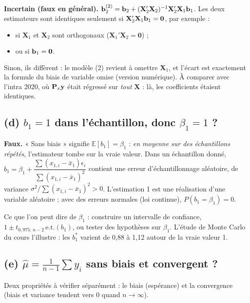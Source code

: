 \documentclass[11pt,a4paper]{article}
\newcommand{\vy}{\mathbf{y}}\newcommand{\vX}{\mathbf{X}}\newcommand{\vZ}{\mathbf{Z}}
\newcommand{\E}{\mathbb{E}}\newcommand{\Var}{\operatorname{Var}}\newcommand{\Cov}{\operatorname{Cov}}
\begin{document}
\begin{reponse}
\textbf{Incertain (faux en général).} $\vb_2^{(2)}=\vb_2+(\vX_2'\vX_2)^{-1}\vX_2'\vX_1\vb_1$. Les deux estimateurs sont identiques seulement si $\vX_2'\vX_1\vb_1=\mathbf 0$, par exemple :
\begin{itemize}[nosep]
\item si $\vX_1$ et $\vX_2$ sont orthogonaux ($\vX_1'\vX_2=\mathbf 0$) ;
\item ou si $\mathbf{b}_1=\mathbf 0$.
\end{itemize}
Sinon, ils diffèrent : le modèle (2) revient à omettre $\vX_1$, et l'écart est exactement la formule du biais de variable omise (version numérique). À comparer avec l'intra 2020, où $\Pm_x\vy$ était régressé sur \emph{tout} $\vX$ : là, les coefficients étaient identiques.
\end{reponse}

\subsection*{(d) $b_1=1$ dans l'échantillon, donc $\beta_1=1$ ?}

\begin{reponse}
\textbf{Faux.} « Sans biais » signifie $\E[b_1]=\beta_1$ : \emph{en moyenne sur des échantillons répétés}, l'estimateur tombe sur la vraie valeur. Dans un échantillon donné, $b_1=\beta_1+\dfrac{\sum(x_{1,i}-\bar x_1)\epsilon_i}{\sum(x_{1,i}-\bar x_1)^2}$ contient une erreur d'échantillonnage aléatoire, de variance $\sigma^2/\sum(x_{1,i}-\bar x_1)^2>0$. L'estimation 1 est une réalisation d'une variable aléatoire ; avec des erreurs normales (loi continue), $P(b_1=\beta_1)=0$.

Ce que l'on peut dire de $\beta_1$ : construire un intervalle de confiance, $1\pm t_{0{,}975;\,n-2}\,\text{e.t.}(b_1)$, ou tester des hypothèses sur $\beta_1$. L'étude de Monte Carlo du cours l'illustre : les $b_1^*$ varient de 0,88 à 1,12 autour de la vraie valeur 1.
\end{reponse}

\subsection*{(e) $\hat\mu=\frac1{n-1}\sum y_i$ sans biais et convergent ?}

\begin{idee}
Deux propriétés à vérifier séparément : le biais (espérance) et la convergence (biais et variance tendent vers 0 quand $n\to\infty$).
\end{idee}
\end{document}
